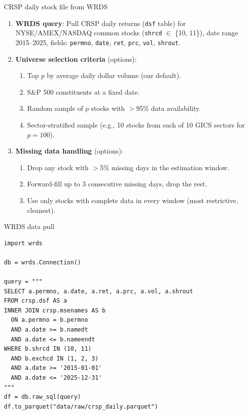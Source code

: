 \documentclass[11pt,a4paper]{article}
\begin{document}
\begin{datanote}{CRSP daily stock file from WRDS}
\begin{enumerate}
  \item \textbf{WRDS query}: Pull CRSP daily returns (\texttt{dsf} table) for NYSE/AMEX/NASDAQ common stocks (\texttt{shrcd} $\in$ \{10, 11\}), date range 2015--2025, fields: \texttt{permno}, \texttt{date}, \texttt{ret}, \texttt{prc}, \texttt{vol}, \texttt{shrout}.
  \item \textbf{Universe selection criteria} (options):
  \begin{enumerate}[nosep]
    \item[(i)] Top $p$ by average daily dollar volume (our default).
    \item[(ii)] S\&P 500 constituents at a fixed date.
    \item[(iii)] Random sample of $p$ stocks with $>$95\% data availability.
    \item[(iv)] Sector-stratified sample (e.g., 10 stocks from each of 10 GICS sectors for $p=100$).
  \end{enumerate}
  \item \textbf{Missing data handling} (options):
  \begin{enumerate}[nosep]
    \item[(i)] Drop any stock with $>$5\% missing days in the estimation window.
    \item[(ii)] Forward-fill up to 3 consecutive missing days, drop the rest.
    \item[(iii)] Use only stocks with complete data in every window (most restrictive, cleanest).
  \end{enumerate}
\end{enumerate}
\end{datanote}

\begin{code}{WRDS data pull}
\begin{lstlisting}
import wrds

db = wrds.Connection()

query = """
SELECT a.permno, a.date, a.ret, a.prc, a.vol, a.shrout
FROM crsp.dsf AS a
INNER JOIN crsp.msenames AS b
  ON a.permno = b.permno
  AND a.date >= b.namedt
  AND a.date <= b.nameendt
WHERE b.shrcd IN (10, 11)
  AND b.exchcd IN (1, 2, 3)
  AND a.date >= '2015-01-01'
  AND a.date <= '2025-12-31'
"""
df = db.raw_sql(query)
df.to_parquet("data/raw/crsp_daily.parquet")
\end{lstlisting}
\end{code}
\end{document}
